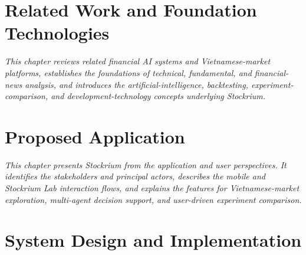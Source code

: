 \documentclass[12pt,a4paper,oneside]{report}
\begin{document}
\clearpage
\chapter{Related Work and Foundation Technologies}

\textit{This chapter reviews related financial AI systems and Vietnamese-market platforms, establishes the foundations of technical, fundamental, and financial-news analysis, and introduces the artificial-intelligence, backtesting, experiment-comparison, and development-technology concepts underlying Stockrium.}









\clearpage
\chapter{Proposed Application}

\textit{This chapter presents Stockrium from the application and user perspectives. It identifies the stakeholders and principal actors, describes the mobile and Stockrium Lab interaction flows, and explains the features for Vietnamese-market exploration, multi-agent decision support, and user-driven experiment comparison.}





\clearpage
\chapter{System Design and Implementation}
\end{document}
